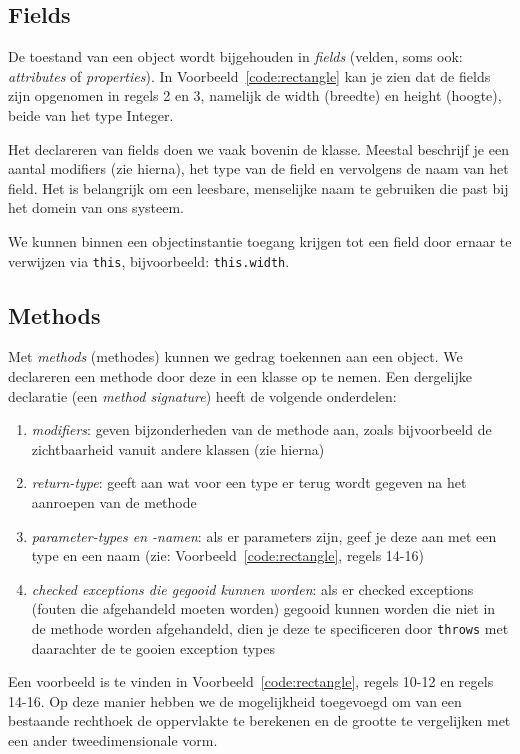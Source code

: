\subsection{Fields}
De toestand van een object wordt bijgehouden in \textit{fields}
(velden, soms ook: \textit{attributes} of \textit{properties}).
In Voorbeeld~\ref{code:rectangle} kan je zien dat de fields zijn opgenomen in regels
2 en 3, namelijk de width (breedte) en height (hoogte), beide van het type Integer.

Het declareren van fields doen we vaak bovenin de klasse. Meestal beschrijf je een 
aantal modifiers (zie hierna), het type van de field en vervolgens 
de naam van het field. Het is belangrijk om een leesbare, menselijke naam te gebruiken 
die past bij het domein van ons systeem. 

We kunnen binnen een objectinstantie toegang krijgen tot 
een field door ernaar te verwijzen via \texttt{this}, bijvoorbeeld: \texttt{this.width}.

\subsection{Methods}
Met \textit{methods} (methodes) kunnen we gedrag toekennen aan een object.
We declareren een methode door deze in een klasse op te nemen. Een dergelijke 
declaratie (een \textit{method signature}) heeft de volgende onderdelen:
\begin{enumerate}
    \item \textit{modifiers}: geven bijzonderheden van de methode aan, 
    zoals bijvoorbeeld de zichtbaarheid vanuit andere klassen (zie hierna)
    \item \textit{return-type}: geeft aan wat voor een type er terug wordt gegeven 
    na het aanroepen van de methode
    \item \textit{parameter-types en -namen}: als er parameters zijn, 
    geef je deze aan met een type en een naam (zie: Voorbeeld~\ref{code:rectangle}, regels 14-16)
    \item \textit{checked exceptions die gegooid kunnen worden}: 
    als er checked exceptions (fouten die afgehandeld moeten worden) gegooid kunnen worden
    die niet in de methode worden afgehandeld, dien je deze te specificeren door \texttt{throws} 
    met daarachter de te gooien exception types
\end{enumerate}

Een voorbeeld is te vinden in Voorbeeld~\ref{code:rectangle}, regels 10-12 en regels 14-16.
Op deze manier hebben we de mogelijkheid toegevoegd om van een bestaande rechthoek
de oppervlakte te berekenen en de grootte te vergelijken met een ander tweedimensionale vorm.

